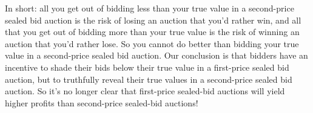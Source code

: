 In short: all you get out of bidding less than your true value in a second-price sealed bid auction is the risk of losing an auction that you'd rather win, and all that you get out of bidding more than your true value is the risk of winning an auction that you'd rather lose. So you cannot do better than bidding your true value in a second-price sealed bid auction. Our conclusion is that bidders have an incentive to shade their bids below their true value in a first-price sealed bid auction, but to truthfully reveal their true values in a second-price sealed bid auction. So it's no longer clear that first-price sealed-bid auctions will yield higher profits than second-price sealed-bid auctions!

\begin{comment}
In the first-price sealed-bid auction, bidders have an incentive to \textbf{shade their bids},\index{auction!shading one's bid} i.e., to bid less than their true values. By bidding less than their true value, each bidder reduces the likelihood that he or she will win the auction, but increases the profits they will make if they do win. It all boils down to an expected value\index{expected value} calculation. (Recall these from Chapter~\ref{1uncertainty}. Your expected value\index{expected value} from bidding $\$x$ in the auction is
\begin{eqnarray*}
\mbox{EV(Bidding $\$x$)} & = & \mbox{Pr(Your $\$x$ bid wins)}\cdot \mbox{Value(Winning)} \\
& & + \mbox{Pr(Your $\$x$ bid loses)}\cdot \mbox{Value(Losing)}.
\end{eqnarray*}
%
Since the value of losing is zero (you get nothing, you pay nothing), the second term disappears. And the value of winning can be thought of as your value of the object (i.e., the maximum amount you would be willing to pay for it) minus your cost (i.e., the amount you actually did pay for it). So your expected value\index{expected value} boils down to something like
\[
\mbox{EV(Bidding $\$x$)} = \mbox{Pr(Your $\$x$ bid wins)}\cdot
(\mbox{Value of object} - x).
\]
%
By reducing your bid, then, you lower the probability that you will win, but you increase the value of winning! Clearly you should shade your bid below your true value---otherwise, your value of winning will be zero. How much to shade your bid is a difficult question, since it depends on how much you think other people will bid\ldots

Now let's look at the second-price sealed-bid auction. In this case, your expected value\index{expected value} of bidding $\$x$ reduces to
\[
\mbox{EV(Bidding \$x)} = \mbox{Pr(Your $\$x$ bid wins)}\cdot
(\mbox{Value of object} - y)
\]
%
where $y$ is the \emph{second-highest} bid. Since the price you pay is not determined by your own bid, shading your bid below your true value doesn't help you. It only increases the probability that you will lose the bid when you would like to have won it. (The same is true for bidding over your true value. This only increases the probability that you will win the object and be forced to pay an amount greater than your true value.)


\end{comment}
